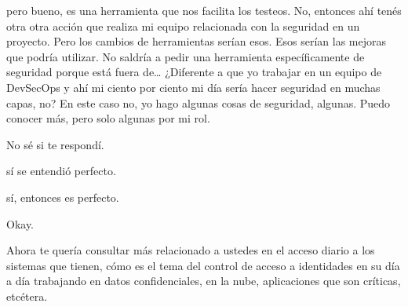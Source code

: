 \begin{description}[leftmargin=0cm, labelsep=0.5cm]
pero bueno, es una herramienta que nos facilita los testeos. No, entonces ahí tenés otra otra acción que realiza mi equipo relacionada con la seguridad en un proyecto. Pero los cambios de herramientas serían esos. Esos serían las mejoras que podría utilizar. No saldría a pedir una herramienta específicamente de seguridad porque está fuera de… ¿Diferente a que yo trabajar en un equipo de DevSecOps y ahí mi ciento por ciento mi día sería hacer seguridad en muchas capas, no? En este caso no, yo hago algunas cosas de seguridad, algunas. Puedo conocer más, pero solo algunas por mi rol.

    \item[\textbf{VILLARINO PABLO RODOLFO:}] No sé si te respondí.

    \item[\textbf{MOCIULSKY SANTIAGO:}] sí se entendió perfecto.

    \item[\textbf{MUNTAABSKI FEDERICO:}] sí, entonces es perfecto.

    \item[\textbf{VILLARINO PABLO RODOLFO:}] Okay.

    \item[\textbf{MOCIULSKY SANTIAGO:}] Ahora te quería consultar más relacionado a ustedes en el acceso diario a los sistemas que tienen, cómo es el tema del control de acceso a identidades en su día a día trabajando en datos confidenciales, en la nube, aplicaciones que son críticas, etcétera.


\end{description}
